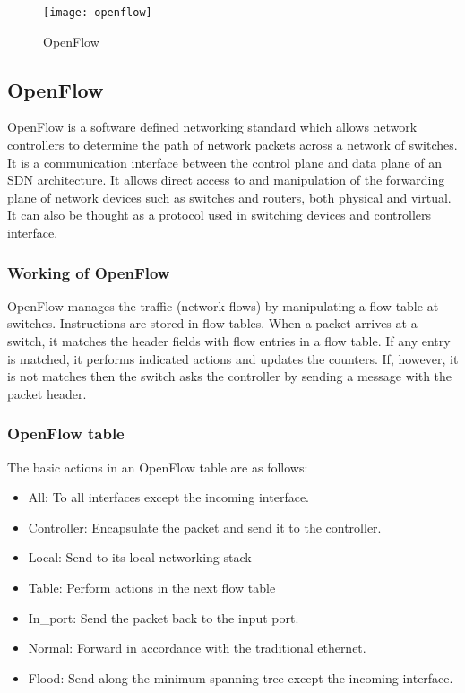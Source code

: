 \begin{figure}[h]
\begin{center}	
\texttt{[image: openflow]} 
\caption{OpenFlow}
\label{fig:openflow}
\end{center}
\end{figure}

\subsection{OpenFlow}
OpenFlow is a software defined networking standard which allows network controllers to determine the path of network packets across a network of switches. It is a communication interface between the control plane and data plane of an SDN architecture. It allows direct access to and manipulation of the forwarding plane of network devices such as switches and routers, both physical and virtual. It can also be thought as a protocol used in switching devices and controllers interface.

\subsubsection{Working of OpenFlow}
OpenFlow manages the traffic (network flows) by manipulating a flow table at switches. Instructions are stored in flow tables. When a packet arrives at a switch, it matches the header fields with flow entries in a flow table. If any entry is matched, it performs indicated actions and updates the counters. If, however, it is not matches then the switch asks the controller by sending a message with the packet header.

\subsubsection{OpenFlow table}
The basic actions in an OpenFlow table are as follows:
\begin{itemize}
    \item All: To all interfaces except the incoming interface.
    \item Controller: Encapsulate the packet and send it to the controller.
    \item Local: Send to its local networking stack
    \item Table: Perform actions in the next flow table 
    \item In\_port: Send the packet back to the input port.
    \item Normal: Forward in accordance with the traditional ethernet.
    \item Flood: Send along the minimum spanning tree except the incoming interface.
\end{itemize}

